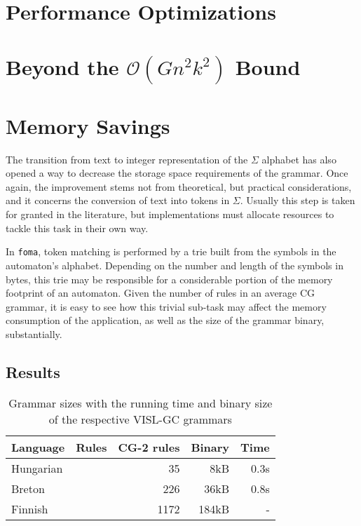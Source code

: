 \documentclass{article}
\begin{document}
\section{Performance Optimizations}
\label{sec:speed}

\section{Beyond the $\mathcal{O}(Gn^2k^2)$ Bound}
\label{sec:idea}

\section{Memory Savings}
\label{sec:memory}

The transition from text to integer representation of the $\Sigma$ alphabet
has also opened a way to decrease the storage space requirements of the grammar.
Once again, the improvement stems not from theoretical, but practical
considerations, and it concerns the conversion of text into tokens in $\Sigma$.
Usually this step is taken for granted in the literature, but implementations
must allocate resources to tackle this task in their own way.

In \texttt{foma}, token matching is performed by a trie built from the symbols
in the automaton's alphabet. Depending on the number and length of the symbols
in bytes, this trie may be responsible for a considerable portion of the memory
footprint of an automaton. Given the number of rules in an average CG grammar,
it is easy to see how this trivial sub-task may affect the memory consumption of
the application, as well as the size of the grammar binary, substantially.



\subsection{Results}

\begin{table*}[h]
  \centering
  \caption{Grammar sizes with the running time and binary size of the respective
           VISL-GC grammars}
  \label{tab:grammar_size}
  \begin{tabular}{ | l | r | r | r | r | }
  \hline
  \textbf{Language} & \textbf{Rules} & \textbf{CG-2 rules} &
  \textbf{Binary} & \textbf{Time} \\
  \hline
  Hungarian & &   35 &   8kB & 0.3s \\
  Breton    & &  226 &  36kB & 0.8s \\
  Finnish   & & 1172 & 184kB & - \\    %
  \hline
  \end{tabular}
\end{table*}
\end{document}
